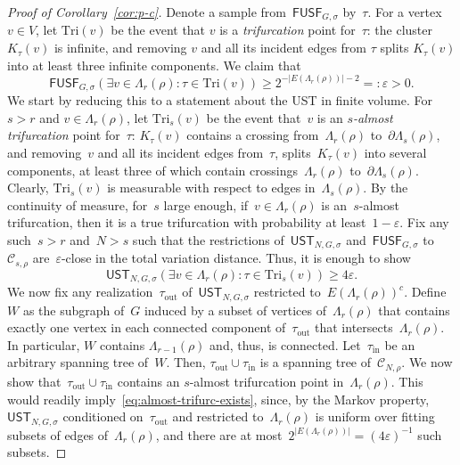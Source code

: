 \documentclass[11pt,letterpaper]{amsart}
\newcounter{n}
\numberwithin{n}{section}
\theoremstyle{plain}
\theoremstyle{definition}
\theoremstyle{remark}
\newcommand\calC{\mathcal C}
\newcommand{\1}{\mathbbm{1}}
\begin{document}
\begin{proof}[Proof of Corollary~\ref{cor:p-c}]
Denote a sample from~$\mathsf{FUSF}_{G,\sigma}$ by~$\tau$.
For a vertex~$v\in V$, let $\mathrm{Tri}(v)$ be the event that $v$ is a {\em trifurcation} point for~$\tau$: the cluster~$K_{\tau}(v)$ is infinite, and removing $v$ and all its incident edges from $\tau$ splits $K_{\tau}(v)$ into at least three infinite components.
We claim that
\begin{equation}\label{eq:trifurc-exists}
	\mathsf{FUSF}_{G,\sigma}(\exists v\in \Lambda_r(\rho) \colon \tau\in \mathrm{Tri}(v)) \geq 2^{-|E(\Lambda_r(\rho))|-2} =: \varepsilon >0.
\end{equation}
We start by reducing this to a statement about the UST in finite volume.
For~$s>r$ and $v\in \Lambda_r(\rho)$, let $\mathrm{Tri}_s(v)$ be the event that~$v$ is an {\em $s$-almost trifurcation} point for~$\tau$: $K_{\tau}(v)$ contains a crossing from~$\Lambda_r(\rho)$ to~$\partial\Lambda_s(\rho)$, and removing~$v$ and all its incident edges from~$\tau$, splits~$K_{\tau}(v)$ into several components, at least three of which contain crossings~$\Lambda_r(\rho)$ to~$\partial\Lambda_s(\rho)$.
Clearly, $\mathrm{Tri}_s(v)$ is measurable with respect to edges in~$\Lambda_s(\rho)$.
By the continuity of measure, for~$s$ large enough, if~$v\in \Lambda_r(\rho)$ is an~$s$-almost trifurcation, then it is a true trifurcation with probability at least~$1-\varepsilon$.
Fix any such~$s>r$ and~$N>s$ such that the restrictions of~$\mathsf{UST}_{N,G,\sigma}$ and~$\mathsf{FUSF}_{G,\sigma}$ to~$\calC_{s,\rho}$ are~$\varepsilon$-close in the total variation distance.
Thus, it is enough to show
\begin{equation}\label{eq:almost-trifurc-exists}
	\mathsf{UST}_{N,G,\sigma}(\exists v\in \Lambda_r(\rho) \colon \tau\in \mathrm{Tri}_s(v)) \geq 4\varepsilon.
\end{equation}
We now fix any realization~$\tau_\mathrm{out}$ of~$\mathsf{UST}_{N,G,\sigma}$ restricted to~$E(\Lambda_r(\rho))^c$.
Define~$W$ as the subgraph of~$G$ induced by a subset of vertices of~$\Lambda_r(\rho)$ that contains exactly one vertex in each connected component of~$\tau_\mathrm{out}$ that intersects~$\Lambda_r(\rho)$.
In particular, $W$ contains $\Lambda_{r-1}(\rho)$ and, thus, is connected.
Let~$\tau_\mathrm{in}$ be an arbitrary spanning tree of~$W$.
Then, $\tau_\mathrm{out}\cup \tau_\mathrm{in}$ is a spanning tree of~$\calC_{N,\rho}$.
We now show that~$\tau_\mathrm{out}\cup \tau_\mathrm{in}$ contains an $s$-almost trifurcation point in~$\Lambda_r(\rho)$.
This would readily imply~\eqref{eq:almost-trifurc-exists}, since, by the Markov property, $\mathsf{UST}_{N,G,\sigma}$ conditioned on~$\tau_\mathrm{out}$ and restricted to~$\Lambda_r(\rho)$ is uniform over fitting subsets of edges of~$\Lambda_r(\rho)$, and there are at most~$2^{|E(\Lambda_r(\rho))|} = (4\varepsilon)^{-1}$ such subsets.

\end{proof}
\end{document}
